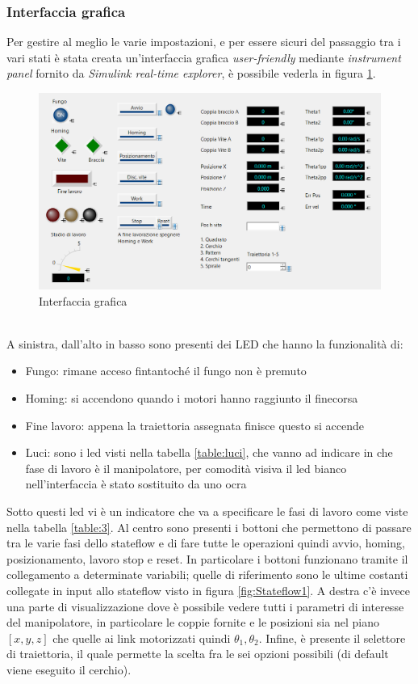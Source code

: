\subsubsection{Interfaccia grafica}
Per gestire al meglio le varie impostazioni, e per essere sicuri del passaggio tra i vari stati è stata creata un'interfaccia grafica \textit{user-friendly} mediante \textit{instrument panel} fornito da \textit{Simulink real-time explorer}, è possibile vederla in figura \ref{fig:gui}.
\begin{figure}[ht]
	\begin{center}
		\includegraphics[scale=0.6]{Immagini/Sperimentale/GUI3}
		\caption{Interfaccia grafica}
		\label{fig:gui}
	\end{center}
\end{figure}
\\A sinistra, dall'alto in basso sono presenti dei LED che hanno la funzionalità di:
\begin{itemize}
	\item Fungo: rimane acceso fintantoché il fungo non è premuto
	\item Homing: si accendono quando i motori hanno raggiunto il finecorsa
	\item Fine lavoro: appena la traiettoria assegnata finisce questo si accende
	\item Luci: sono i led visti nella tabella \ref{table:luci}, che vanno ad indicare in che fase di lavoro è il manipolatore, per comodità visiva il led bianco nell'interfaccia è stato sostituito da uno ocra
\end{itemize} 
Sotto questi led vi è un indicatore che va a specificare le fasi di lavoro come viste nella tabella \ref{table:3}. Al centro sono presenti i bottoni che permettono di passare tra le varie fasi dello stateflow e di fare tutte le operazioni quindi avvio, homing, posizionamento, lavoro stop e reset. In particolare i bottoni funzionano tramite il collegamento a determinate variabili; quelle di riferimento sono le ultime costanti collegate in input allo stateflow visto in figura \ref{fig:Stateflow1}. A destra c'è invece una parte di visualizzazione dove è possibile vedere tutti i parametri di interesse del manipolatore, in particolare le coppie fornite e le posizioni sia nel piano $[x,y,z]$ che quelle ai link motorizzati quindi $\theta_1,\theta_2$. Infine, è presente il selettore di traiettoria, il quale permette la scelta fra le sei opzioni possibili (di default viene eseguito il cerchio).
